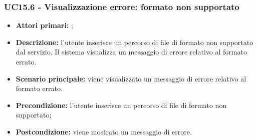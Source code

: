 \subsubsection{UC15.6 - Visualizzazione errore: formato non supportato}
\begin{itemize}
	\item \textbf{Attori primari:} \us{};
	\item \textbf{Descrizione:} l’utente inserisce un percorso di file di formato non supportato dal servizio. Il sistema visualizza un messaggio di errore relativo al formato errato.
	\item \textbf{Scenario principale:} viene visualizzato un messaggio di errore relativo al formato errato.
	\item \textbf{Precondizione:} l'utente inserisce un percorso di file di formato non supportato;
	\item \textbf{Postcondizione:} viene mostrato un messaggio di errore. 
\end{itemize}